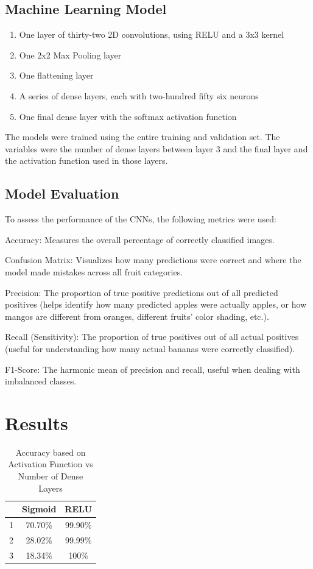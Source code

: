 \documentclass[conference]{IEEEtran}
\begin{document}
\subsection{Machine Learning Model}
\begin{enumerate}
    \item One layer of thirty-two 2D convolutions, using RELU and a 3x3 kernel
    \item One 2x2 Max Pooling layer
    \item One flattening layer
    \item A series of dense layers, each with two-hundred fifty six neurons
    \item One final dense layer with the softmax activation function
\end{enumerate}
The models were trained using the entire training and validation set. The variables were the number of dense layers between layer 3 and the final layer and the activation function used in those layers.
\subsection{Model Evaluation}\label{SCM}
To assess the performance of the CNNs, the following metrics were used:

Accuracy: Measures the overall percentage of correctly classified images.


Confusion Matrix: Visualizes how many predictions were correct and where the model made mistakes across all fruit categories.


Precision: The proportion of true positive predictions out of all predicted positives (helps identify how many predicted apples were actually apples, or how mangos are different from oranges, different fruits’ color shading, etc.).


Recall (Sensitivity): The proportion of true positives out of all actual positives (useful for understanding how many actual bananas were correctly classified).


F1-Score: The harmonic mean of precision and recall, useful when dealing with imbalanced classes.

\section{Results}

\begin{table}[h!]
    \centering
    \begin{tabular}{|c|c|c|}
    \hline
          & Sigmoid & RELU\\ \hline
         1& 70.70\% & 99.90\%\\ \hline
         2& 28.02\% & 99.99\%\\ \hline
         3& 18.34\% & 100\%\\ \hline
    \end{tabular}
    \vspace{3pt}
    \caption{Accuracy  based on Activation Function vs Number of Dense Layers}
    \label{tab:my_label}
\end{table}
\end{document}

